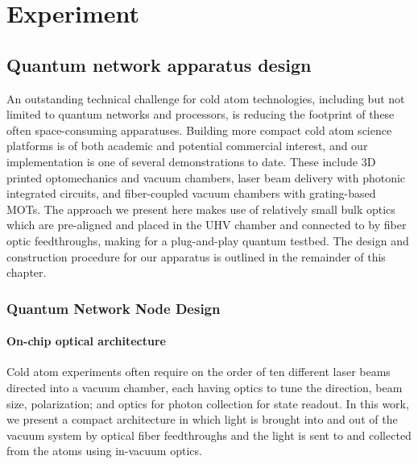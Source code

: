 \part{Experiment}\label{part:experiment}
\chapter{Quantum network apparatus design}\label{ch:nodes}

An outstanding technical challenge for cold atom technologies, including but not limited to quantum networks and processors, is reducing the footprint of these often space-consuming apparatuses. Building more compact cold atom science platforms is of both academic and potential commercial interest, and our implementation is one of several demonstrations to date. These include 3D printed optomechanics and vacuum chambers\cite{madkhaly2021performance}, laser beam delivery with photonic integrated circuits\cite{isichenko2023photonic}, and fiber-coupled vacuum chambers with grating-based MOTs\cite{lee2022compact}. The approach we present here makes use of relatively small bulk optics which are pre-aligned and placed in the UHV chamber and connected to by fiber optic feedthroughs, making for a plug-and-play quantum testbed. The design and construction procedure for our apparatus is outlined in the remainder of this chapter.

\section{Quantum Network Node Design}
\subsection{On-chip optical architecture}

Cold atom experiments often require on the order of ten different laser beams directed into a vacuum chamber, each having optics to tune the direction, beam size, polarization; and optics for photon collection for state readout. In this work, we present a compact architecture in which light is brought into and out of the vacuum system by optical fiber feedthroughs and the light is sent to and collected from the atoms using in-vacuum optics. 


